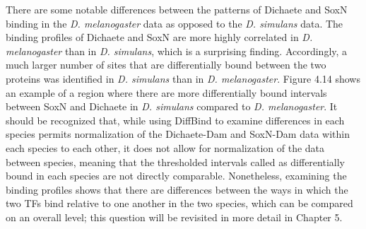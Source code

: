 There are some notable differences between the patterns of Dichaete and SoxN binding in the \emph{D. melanogaster} data as opposed to the \emph{D. simulans} data. The binding profiles of Dichaete and SoxN are more highly correlated in \emph{D. melanogaster} than in \emph{D. simulans}, which is a surprising finding. Accordingly, a much larger number of sites that are differentially bound between the two proteins was identified in \emph{D. simulans} than in \emph{D. melanogaster}. Figure 4.14 shows an example of a region where there are more differentially bound intervals between SoxN and Dichaete in \emph{D. simulans} compared to \emph{D. melanogaster}. It should be recognized that, while using DiffBind to examine differences in each species permits normalization of the Dichaete-Dam and SoxN-Dam data within each species to each other, it does not allow for normalization of the data between species, meaning that the thresholded intervals called as differentially bound in each species are not directly comparable. Nonetheless, examining the binding profiles shows that there are differences between the ways in which the two TFs bind relative to one another in the two species, which can be compared on an overall level; this question will be revisited in more detail in Chapter 5.\\

